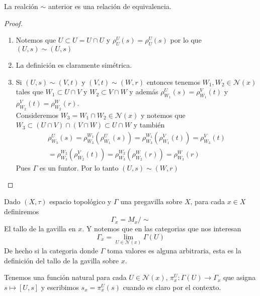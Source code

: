 \documentclass[14pt]{extarticle}
\begin{document}
\begin{proposicion}{}{}
    La realción $\sim$ anterior es una relación de 
    equivalencia.
\end{proposicion}
\begin{proof}
    \begin{enumerate}
        \item Notemos que $U\subset U=U\cap U$ y
        $\rho_{U}^{U}(s)=\rho_{U}^{U}(s)$
        por lo que $(U,s)\sim (U,s)$
        \item La definición es claramente simétrica.
        \item Si $(U,s)\sim (V,t)$ y $(V,t)\sim(W,r)$
        entonces tenemos $W_1,W_2\in \mathcal{N}(x)$
        tales que $W_1\subset U\cap V$ y 
        $W_2\subset V\cap W$ y además
        $\rho_{W_1}^{U}(s)=\rho_{W_1}^{V}(t)$
        y $\rho_{W_2}^{V}(t)=\rho_{W_2}^{W}(r)$.\\
        Consideremos $W_3 = W_1\cap W_2 \in\mathcal{N}(x)$
        y notemos que $W_3 \subset (U\cap V)\cap (V\cap W)\subset U\cap W$
        y también
        \begin{align*}
            \rho_{W_3}^{U}(s)
            =\rho_{W_3}^{W_1}(\rho_{W_1}^{U}(s))
            =\rho_{W_3}^{W_1}(\rho_{W_1}^{V}(t))
            =\rho_{W_3}^{V}(t)\\
            =\rho_{W_3}^{W_2}(\rho_{W_2}^{V}(t))
            =\rho_{W_3}^{W_2}(\rho_{W_2}^{W}(r))
            =\rho_{W_3}^{W}(r)
        \end{align*}
        Pues $\Gamma$ es un funtor. Por lo tanto
        $(U,s)\sim (W,r)$
    \end{enumerate}
\end{proof}

\begin{definicion}{}{}
    Dado $(X,\tau)$ espacio topológico y
    $\Gamma$ una pregavilla sobre $X$,
    para cada $x\in X$ definiremos
    $$\Gamma_x=M_x/\sim$$
    El tallo de la gavilla en $x$.
    Y notemos que en las categorias que nos 
    interesan 
    $$\Gamma_x= \lim_{U\in \mathcal{N}(x)}\Gamma(U)$$
    De hecho si la categoria donde $\Gamma$
    toma valores es alguna arbitraria, esta
    es la definición del tallo de la gavilla 
    sobre $x$.
\end{definicion}

\begin{observacion}{}{}
    Tenemos una función natural
    para cada $U\in \mathcal{N}(x)$,
    $\pi_x^{U}:\Gamma(U)\rightarrow \Gamma_x$
    que asigna $s \mapsto [U,s]$
    y escribimos $s_x = \pi_x^{U}(s)$ cuando
    es claro por el contexto.
\end{observacion}
\end{document}
